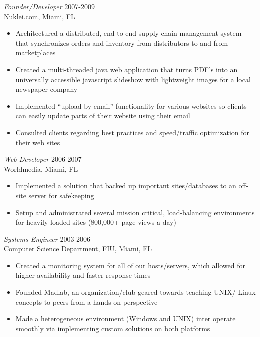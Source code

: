 \documentclass[margin]{res}
\begin{document}
\begin{resume}
  {\sl Founder/Developer } \hfill 2007-2009 \\
  Nuklei.com, Miami, FL
  \begin{itemize}  \itemsep -2pt %
    \item Architectured a distributed, end to end supply chain management system that synchronizes orders
      and inventory from distributors to and from marketplaces
    \item Created a multi-threaded java web application that turns PDF's into an
      universally accessible javascript slideshow with lightweight images for a local newspaper
      company
    \item Implemented ``upload-by-email'' functionality for various websites so clients can easily 
      update parts of their website using their email
    \item Consulted clients regarding best practices and speed/traffic optimization for their
      web sites

  \end{itemize}

  {\sl Web Developer} \hfill 2006-2007 \\
  Worldmedia, Miami, FL
  \begin{itemize}  \itemsep -2pt %
    \item Implemented a solution that backed up important sites/databases
      to an off-site server for safekeeping
    \item Setup and administrated several mission critical, load-balancing
      environments for heavily loaded sites (800,000+ page views a day)
  \end{itemize}

  {\sl Systems Engineer} \hfill            2003-2006 \\
  Computer Science Department, FIU, Miami, FL
  \begin{itemize}  \itemsep -2pt %
    \item Created a monitoring system for all of our hosts/servers, which allowed
      for higher availability and faster response times
    \item Founded Madlab, an organization/club geared towards teaching UNIX/
      Linux concepts to peers from a hands-on perspective
    \item Made a heterogeneous environment (Windows and UNIX) inter
      operate smoothly via implementing custom solutions on both platforms
  \end{itemize} 


\end{resume}
\end{document}
